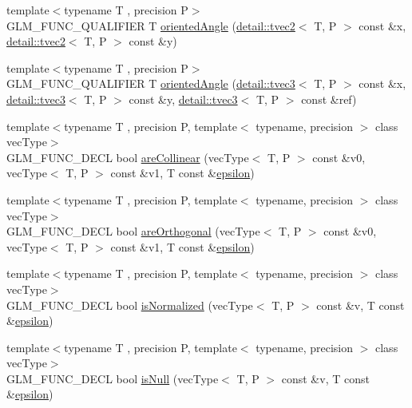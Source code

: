 \begin{DoxyCompactItemize}
\item 
{\footnotesize template$<$typename T , precision P$>$ }\\G\-L\-M\-\_\-\-F\-U\-N\-C\-\_\-\-Q\-U\-A\-L\-I\-F\-I\-E\-R T \hyperlink{group__gtx__vector__angle_ga6f9cbae1b02b49ad92a1d0070649f038}{oriented\-Angle} (\hyperlink{structglm_1_1detail_1_1tvec2}{detail\-::tvec2}$<$ T, P $>$ const \&x, \hyperlink{structglm_1_1detail_1_1tvec2}{detail\-::tvec2}$<$ T, P $>$ const \&y)
\item 
{\footnotesize template$<$typename T , precision P$>$ }\\G\-L\-M\-\_\-\-F\-U\-N\-C\-\_\-\-Q\-U\-A\-L\-I\-F\-I\-E\-R T \hyperlink{group__gtx__vector__angle_ga2aefc221dd5ed9fdacc17c28eea76775}{oriented\-Angle} (\hyperlink{structglm_1_1detail_1_1tvec3}{detail\-::tvec3}$<$ T, P $>$ const \&x, \hyperlink{structglm_1_1detail_1_1tvec3}{detail\-::tvec3}$<$ T, P $>$ const \&y, \hyperlink{structglm_1_1detail_1_1tvec3}{detail\-::tvec3}$<$ T, P $>$ const \&ref)
\item 
{\footnotesize template$<$typename T , precision P, template$<$ typename, precision $>$ class vec\-Type$>$ }\\G\-L\-M\-\_\-\-F\-U\-N\-C\-\_\-\-D\-E\-C\-L bool \hyperlink{group__gtx__vector__query_ga465b844190d1740051e45d780832ea4c}{are\-Collinear} (vec\-Type$<$ T, P $>$ const \&v0, vec\-Type$<$ T, P $>$ const \&v1, T const \&\hyperlink{group__gtc__constants_gacb41049b8d22c8aa90e362b96c524feb}{epsilon})
\item 
{\footnotesize template$<$typename T , precision P, template$<$ typename, precision $>$ class vec\-Type$>$ }\\G\-L\-M\-\_\-\-F\-U\-N\-C\-\_\-\-D\-E\-C\-L bool \hyperlink{group__gtx__vector__query_gaee10acefed397c11e01f2862e837754c}{are\-Orthogonal} (vec\-Type$<$ T, P $>$ const \&v0, vec\-Type$<$ T, P $>$ const \&v1, T const \&\hyperlink{group__gtc__constants_gacb41049b8d22c8aa90e362b96c524feb}{epsilon})
\item 
{\footnotesize template$<$typename T , precision P, template$<$ typename, precision $>$ class vec\-Type$>$ }\\G\-L\-M\-\_\-\-F\-U\-N\-C\-\_\-\-D\-E\-C\-L bool \hyperlink{group__gtx__vector__query_ga6fa5fa2af67d14c205d24c49aad03270}{is\-Normalized} (vec\-Type$<$ T, P $>$ const \&v, T const \&\hyperlink{group__gtc__constants_gacb41049b8d22c8aa90e362b96c524feb}{epsilon})
\item 
{\footnotesize template$<$typename T , precision P, template$<$ typename, precision $>$ class vec\-Type$>$ }\\G\-L\-M\-\_\-\-F\-U\-N\-C\-\_\-\-D\-E\-C\-L bool \hyperlink{group__gtx__vector__query_ga81a64edc1a2b470b82896592e89c523b}{is\-Null} (vec\-Type$<$ T, P $>$ const \&v, T const \&\hyperlink{group__gtc__constants_gacb41049b8d22c8aa90e362b96c524feb}{epsilon})

\end{DoxyCompactItemize}

